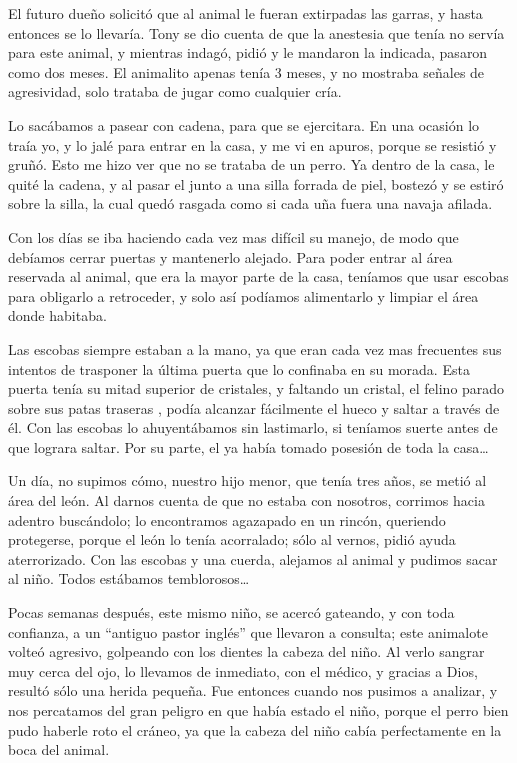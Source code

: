 \documentclass[letterpaper, 12pt]{book}
\begin{document}
El futuro dueño solicitó que al animal le fueran extirpadas las garras, y hasta entonces se lo llevaría. Tony se dio cuenta de que la anestesia que tenía no servía para este animal, y mientras indagó, pidió y le mandaron la indicada, pasaron como dos meses. El animalito apenas tenía 3 meses, y no mostraba señales de agresividad, solo trataba de jugar como cualquier cría.

Lo sacábamos a pasear con cadena, para que se ejercitara. En una ocasión lo traía yo, y lo jalé para entrar en la casa, y me vi en apuros, porque se resistió y gruñó. Esto me hizo ver que no se trataba de un perro. Ya dentro de la casa, le quité la cadena, y al pasar el junto a una silla forrada de piel, bostezó y se estiró sobre la silla, la cual quedó rasgada como si cada uña fuera una navaja afilada.

Con los días se iba haciendo cada vez mas difícil su manejo, de modo que debíamos cerrar puertas y mantenerlo alejado. Para poder entrar al área reservada al animal, que era la mayor parte de la casa, teníamos que usar escobas para obligarlo a retroceder, y solo así podíamos alimentarlo y limpiar el área donde habitaba.

Las escobas siempre estaban a la mano, ya que eran cada vez mas frecuentes sus intentos de trasponer la última puerta que lo confinaba en su morada. Esta puerta tenía su mitad superior de cristales, y faltando un cristal, el felino parado sobre sus patas traseras , podía alcanzar fácilmente el hueco y saltar a través de él. Con las escobas lo ahuyentábamos sin lastimarlo, si teníamos suerte antes de que lograra saltar. Por su parte, el ya había tomado posesión de toda la casa\ldots

Un día, no supimos cómo, nuestro hijo menor, que tenía tres años, se metió al área del león. Al darnos cuenta de que no estaba con nosotros, corrimos hacia adentro buscándolo; lo encontramos agazapado en un rincón, queriendo protegerse, porque el león lo tenía acorralado; sólo al vernos, pidió ayuda aterrorizado. Con las escobas y una cuerda, alejamos al animal y pudimos sacar al niño. Todos estábamos temblorosos\ldots

Pocas semanas después, este mismo niño, se acercó gateando, y con toda confianza, a un ``antiguo pastor inglés'' que llevaron a consulta; este animalote volteó agresivo, golpeando con los dientes la cabeza del niño. Al verlo sangrar muy cerca del ojo, lo llevamos de inmediato, con el médico, y gracias a Dios, resultó sólo una herida pequeña. Fue entonces cuando nos pusimos a analizar, y nos percatamos del gran peligro en que había estado el niño, porque el perro bien pudo haberle roto el cráneo, ya que la cabeza del niño cabía perfectamente en la boca del animal.
\end{document}
